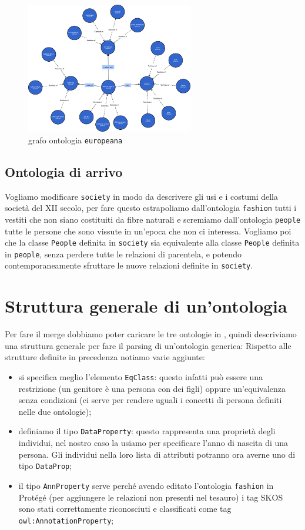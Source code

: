 \begin{figure}[H]
	\centering	
	\includegraphics[width=0.65\textwidth]{Picture/europeana_relation.pdf}
	\caption{\label{fig:ontEur}grafo ontologia \texttt{europeana}}
\end{figure}
\subsection{Ontologia di arrivo}
Vogliamo modificare \verb|society| in modo da descrivere gli usi e i costumi della società del XII secolo, per fare questo estrapoliamo dall'ontologia \verb|fashion| tutti i vestiti che non siano costituiti da fibre naturali e scremiamo dall'ontologia \verb|people| tutte le persone che sono vissute in un'epoca che non ci interessa. Vogliamo poi che la classe \verb|People| definita in \verb|society| sia equivalente alla classe \verb|People| definita in \verb|people|, senza perdere tutte le relazioni di parentela, e potendo contemporaneamente sfruttare le nuove relazioni definite in \verb|society|.
\section{Struttura generale di un'ontologia}
Per fare il merge dobbiamo poter caricare le tre ontologie in \cduce, quindi descriviamo una struttura generale per fare il parsing di un'ontologia generica:
Rispetto alle strutture definite in precedenza notiamo varie aggiunte:
\begin{itemize}
	\item si specifica meglio l'elemento \verb|EqClass|: questo infatti può essere una restrizione (un genitore è una persona con dei figli) oppure un'equivalenza senza condizioni (ci serve per rendere uguali i concetti di persona definiti nelle due ontologie);
	\item definiamo il tipo \verb|DataProperty|: questo rappresenta una proprietà degli individui, nel nostro caso la usiamo per specificare l'anno di nascita di una persona. Gli individui nella loro lista di attributi potranno ora averne uno di tipo \verb|DataProp|;
	\item il tipo \verb|AnnProperty| serve perché avendo editato l'ontologia \verb|fashion| in Protégé (per aggiungere le relazioni non presenti nel tesauro) i tag SKOS sono stati correttamente riconosciuti \cite{OWL&SKOS} e classificati come tag \verb|owl:AnnotationProperty|;
\end{itemize}
